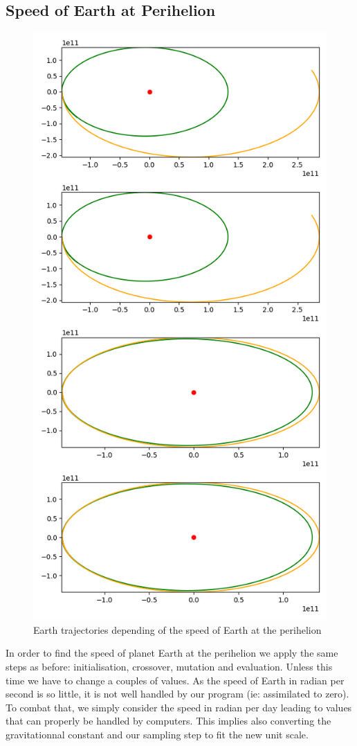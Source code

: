\subsection{Speed of Earth at Perihelion}
\begin{figure}
    \center
    \includegraphics[width=0.5\linewidth,scale=.3]{img/earth_speed.png}
    \caption{Earth trajectories depending of the speed of Earth at the perihelion}
\end{figure}

In order to find the speed of planet Earth at the perihelion we apply the same steps as before: initialisation, crossover, mutation and evaluation. Unless this time we have to change a couples of values. As the speed of Earth in radian per second is so little, it is not well handled by our program (ie: assimilated to zero). To combat that, we simply consider the speed in radian per day leading to values that can properly be handled by computers. This implies also converting the gravitationnal constant and our sampling step to fit the new unit scale.